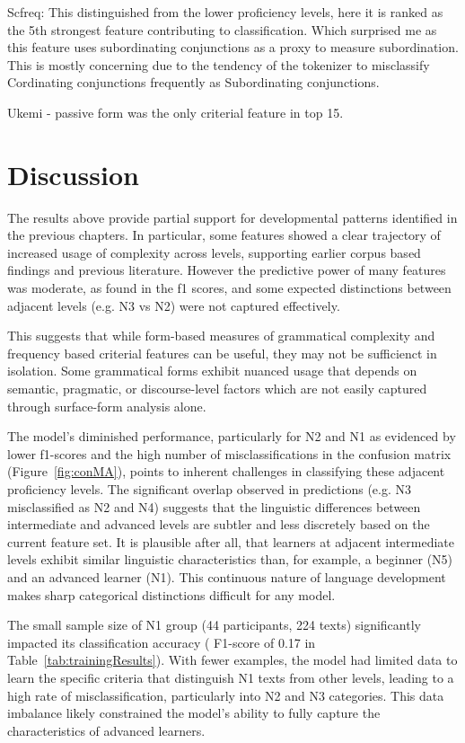Scfreq: This distinguished from the lower proficiency levels, here it is ranked as the 5th strongest feature
contributing to classification. Which surprised me as this feature uses subordinating conjunctions as a proxy to
measure subordination. This is mostly concerning due to the tendency of the tokenizer to misclassify Cordinating
conjunctions frequently as Subordinating conjunctions.

Ukemi - passive form was the only criterial feature in top 15.


\section{Discussion}

The results above provide partial support for developmental patterns identified in the previous chapters. In
particular, some features showed a clear trajectory of increased usage of complexity across levels, supporting
earlier corpus based findings and previous literature. However the predictive power of many features was moderate,
as found in the f1 scores, and some expected distinctions between adjacent levels (e.g. N3 vs N2) were not captured
effectively.

This suggests that while form-based measures of grammatical complexity and frequency based criterial features can be
useful, they may not be sufficienct in isolation. Some grammatical forms exhibit nuanced usage that depends on
semantic, pragmatic, or discourse-level factors which are not easily captured through surface-form
analysis alone.

The model's diminished performance, particularly for N2 and N1 as evidenced by lower f1-scores and the high number
of misclassifications in the confusion matrix (Figure~\ref{fig:conMA}), points to inherent challenges in
classifying these adjacent proficiency levels. The significant overlap observed in predictions (e.g. N3 misclassified
as N2 and N4) suggests that the linguistic differences between intermediate and advanced levels are subtler and less
discretely based on the current feature set. It is plausible after all, that learners at adjacent intermediate
levels exhibit similar linguistic characteristics than, for example, a beginner (N5) and an advanced learner (N1).
This continuous nature of language development makes sharp categorical distinctions difficult for any model.

The small sample size of N1 group (44 participants, 224 texts) significantly impacted its classification accuracy (
F1-score
of 0.17 in Table~\ref{tab:trainingResults}). With fewer examples, the model had limited data to learn the specific
criteria that distinguish N1 texts from other levels, leading to a high rate of misclassification, particularly into
N2 and N3 categories. This data imbalance likely constrained the model's ability to fully capture the
characteristics of advanced learners.


